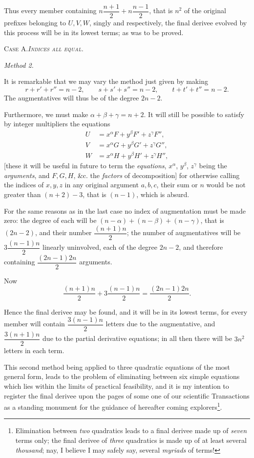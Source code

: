 \documentclass[11pt]{article}
\newcommand{\sourcepage}[1]{\marginpar{\scriptsize p.~#1}}
\begin{document}
Thus every member containing $n\dfrac{n+1}{2}+n\dfrac{n-1}{2}$, that is $n^2$ of the original prefixes belonging to $U,V,W$, singly and respectively, the final derivee evolved by this process will be in its lowest terms; as was to be proved.

\begin{center}\scshape Case A.\quad \emph{Indices all equal.}\end{center}

\begin{center}\itshape Method 2.\end{center}

It is remarkable that we may vary the method just given by making
\[
 r+r'+r''=n-2,
 \qquad s+s'+s''=n-2,
 \qquad t+t'+t''=n-2.
\]
The augmentatives will thus be of the degree $2n-2$.

Furthermore, we must make $\alpha+\beta+\gamma=n+2$. It will still be possible to satisfy by integer multipliers the equations
\[
\begin{aligned}
 U&=x^\alpha F+y^\beta F'+z^\gamma F'',\\
 V&=x^\alpha G+y^\beta G'+z^\gamma G'',\\
 W&=x^\alpha H+y^\beta H'+z^\gamma H'',
\end{aligned}
\]
[these it will be useful in future to term the \emph{equations}, $x^\alpha$, $y^\beta$, $z^\gamma$ being the \emph{arguments}, and $F,G,H$, \&c. the \emph{factors} of decomposition] for otherwise calling the indices of $x,y,z$ in any original argument $a,b,c$, their sum or $n$ would be not greater than $(n+2)-3$, that is $(n-1)$, which is absurd.

For the same reasons as in the last case no index of augmentation must be made zero: the degree of each will be $(n-\alpha)+(n-\beta)+(n-\gamma)$, that is $(2n-2)$, and their number $\dfrac{(n+1)n}{2}$; the number of augmentatives will be $3\dfrac{(n-1)n}{2}$ linearly uninvolved, each of the degree $2n-2$, and therefore containing $\dfrac{(2n-1)2n}{2}$ arguments.

Now
\[
 \frac{(n+1)n}{2}+3\frac{(n-1)n}{2}=\frac{(2n-1)2n}{2}.
\]

\sourcepage{80}
Hence the final derivee may be found, and it will be in its lowest terms, for every member will contain $\dfrac{3(n-1)n}{2}$ letters due to the augmentative, and $\dfrac{3(n+1)n}{2}$ due to the partial derivative equations; in all then there will be $3n^2$ letters in each term.

This second method being applied to three quadratic equations of the most general form, leads to the problem of eliminating between six simple equations which lies within the limits of practical feasibility, and it is my intention to register the final derivee upon the pages of some one of our scientific Transactions as a standing monument for the guidance of hereafter coming explorers\footnote{Elimination between \emph{two} quadratics leads to a final derivee made up of \emph{seven} terms only; the final derivee of \emph{three} quadratics is made up of at least several \emph{thousand}; nay, I believe I may safely say, several \emph{myriads} of terms!}.
\end{document}
